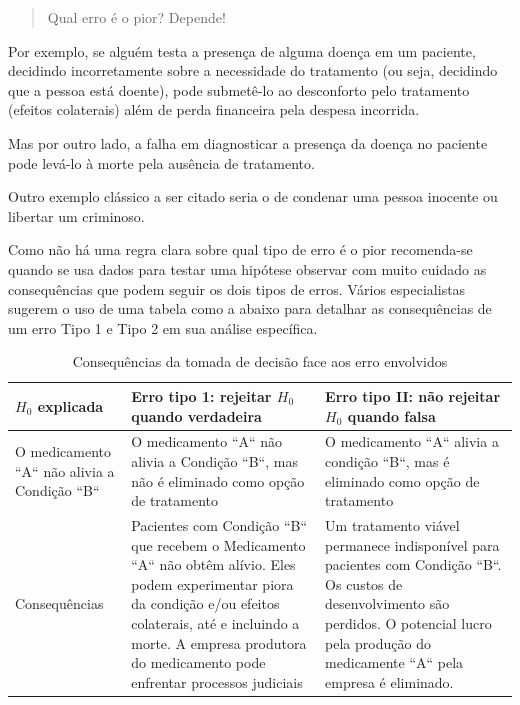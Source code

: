 \documentclass[
]{book}
\begin{document}
\hfill\break

\begin{quote}
Qual erro é o pior? Depende!
\end{quote}

\hfill\break

Por exemplo, se alguém testa a presença de alguma doença em um paciente, decidindo incorretamente sobre a necessidade do tratamento (ou seja, decidindo que a pessoa está doente), pode submetê-lo ao desconforto pelo tratamento (efeitos colaterais) além de perda financeira pela despesa incorrida.

\hfill\break

Mas por outro lado, a falha em diagnosticar a presença da doença no paciente pode levá-lo à morte pela ausência de tratamento.

\hfill\break

Outro exemplo clássico a ser citado seria o de condenar uma pessoa inocente ou libertar um criminoso.

\hfill\break

Como não há uma regra clara sobre qual tipo de erro é o pior recomenda-se quando se usa dados para testar uma hipótese observar com muito cuidado as consequências que podem seguir os dois tipos de erros. Vários especialistas sugerem o uso de uma tabela como a abaixo para detalhar as consequências de um erro Tipo 1 e Tipo 2 em sua análise específica.

\hfill\break

\begin{table}[h]
\centering
\caption{{\small Consequências da tomada de decisão face aos erro envolvidos}}
\begin{tabular}{p{5cm}p{5cm}p{5cm}}
\hline
\rowcolor{lightgray} $H_{0}$ explicada & Erro tipo 1: rejeitar $H_{0}$ quando verdadeira & Erro tipo II: não rejeitar $H_{0}$ quando falsa \\   
\hline
O medicamento ``A`` não alivia a Condição ``B`` & O medicamento ``A`` não alivia a Condição ``B``, mas não é eliminado como opção de tratamento & O medicamento ``A`` alivia a condição ``B``, mas é eliminado como opção de tratamento\\
\hline                           
Consequências  &  Pacientes com Condição ``B`` que recebem o Medicamento ``A`` não obtêm alívio. Eles podem experimentar piora da condição e/ou efeitos colaterais, até e incluindo a morte. A empresa produtora do medicamento pode enfrentar processos judiciais & Um tratamento viável permanece indisponível para pacientes com Condição ``B``. Os custos de desenvolvimento são perdidos. O potencial lucro pela produção do medicamente ``A`` pela empresa é eliminado. \\
\hline
\end{tabular}
\end{table} 
\end{document}

